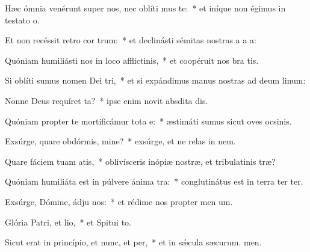 \item Hæc ómnia venérunt super nos, nec oblíti mus te:~* et iníque non égimus in testato o.
\item Et non recéssit retro cor trum:~* et declinásti sémitas nostras a a a:
\item Quóniam humiliásti nos in loco afflictinis,~* et coopéruit nos bra tis.
\item Si oblíti sumus nomen Dei tri,~* et si expándimus manus nostras ad deum linum:
\item Nonne Deus requíret ta?~* ipse enim novit absdita dis.
\item Quóniam propter te mortificámur tota e:~* æstimáti sumus sicut oves ocsinis.
\item Exsúrge, quare obdórmis, mine?~* exsúrge, et ne relas in nem.
\item Quare fáciem tuam atis,~* oblivísceris inópiæ nostræ, et tribulatinis træ?
\item Quóniam humiliáta est in púlvere ánima tra:~* conglutinátus est in terra ter ter.
\item Exsúrge, Dómine, ádju nos:~* et rédime nos propter men um.
\item Glória Patri, et lio,~* et Spitui to.
\item Sicut erat in princípio, et nunc, et per,~* et in sǽcula sæcurum. men.
